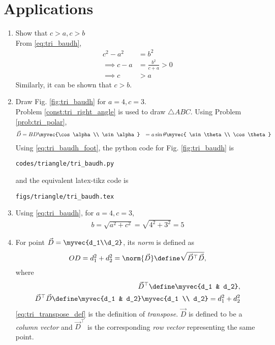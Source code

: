 \section{Applications}
\begin{enumerate}[label=\thesection.\arabic*.,ref=\thesection.\theenumi]
\item Show that $c > a, c > b$
%
	\\
\solution From 	\eqref{eq:tri_baudh},
	\begin{align}
	c^2 - a^2 &= b^2
\\
\implies c-a &= \frac{b^2}{c+a} > 0 
\\
\implies c &> a
	\end{align}
%
Similarly, it can be shown that $c > b$.
\iffalse
\item Draw Fig. \ref{fig:tri_baudh} for $a = 4, c =3$.
\label{const:tri_baudh}
%
\\
\solution Problem \ref{const:tri_right_angle} is used to draw $\triangle ABC$.
%
Using Problem \ref{prob:tri_polar},
\begin{align}
\vec{D} &= BD\myvec{\cos \alpha\\  \sin \alpha} 
&= a \sin \theta \myvec{ \sin \theta \\ \cos \theta } 
\label{eq:tri_baudh_foot}
\end{align}
%
Using \eqref{eq:tri_baudh_foot}, the python code for  Fig. \ref{fig:tri_baudh} is
\begin{lstlisting}
codes/triangle/tri_baudh.py
\end{lstlisting}
%
and the equivalent latex-tikz code is
%
\begin{lstlisting}
figs/triangle/tri_baudh.tex
\end{lstlisting}
%
\item Using 	\eqref{eq:tri_baudh}, for $a = 4, c = 3$,
%
\begin{align}
b = \sqrt{a^2+c^2} = \sqrt{4^2+3^2} = 5
\end{align}
%
\item For  point $\vec{D} = \myvec{d_1\\d_2}$, its {\em norm} is defined as
%
\begin{align}
OD = d_1^2+d_2^2 = \norm{\vec{D}} \define \sqrt{\vec{D}^{\top}\vec{D}}, 
\label{eq:tri_norm_def}
\end{align}
%
where 
%
\begin{align}
\label{eq:tri_transpose_def}
 \vec{D}^{\top}  \define \myvec{d_1 & d_2},
\\
\vec{D}^{\top}\vec{D} \define \myvec{d_1 & d_2} \myvec{d_1 \\ d_2} = d_1^2+d_2^2
\end{align}
%
\eqref{eq:tri_transpose_def} is the definition of {\em transpose}. $\vec{D}$ is defined to be a {\em column vector} and $\vec{D}^{\top}$  is the corresponding {\em row vector} representing the same point.


\end{enumerate}
